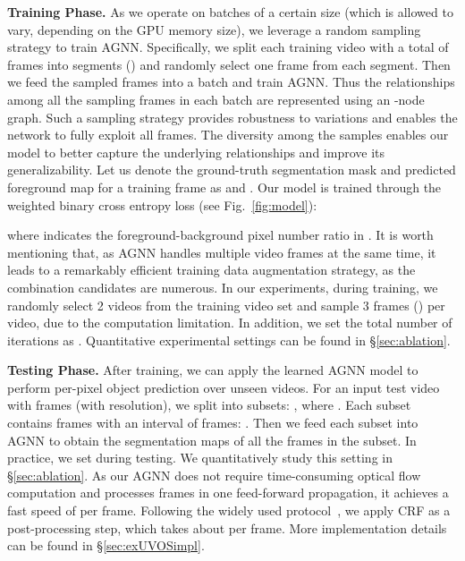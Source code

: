 \documentclass[10pt,twocolumn,letterpaper]{article}
\begin{document}
\noindent\textbf{Training Phase.} As we operate on batches of a certain size (which is allowed to vary, depending on the GPU memory size), we leverage a random sampling strategy to train AGNN. Specifically, we split each training video  with a total of  frames into  segments () and randomly select one frame from each segment. Then we feed the  sampled frames into a batch and train AGNN. Thus the relationships among all the  sampling frames in each batch are represented using an -node graph. Such a sampling strategy provides robustness to variations and enables the network to fully exploit all frames. The diversity among the samples enables our model to better capture the underlying relationships and improve its generalizability. Let us denote the ground-truth segmentation mask and predicted foreground map for a training frame  as  and . Our model is trained through the weighted binary cross entropy loss  (see Fig.~\ref{fig:model}):
	\vspace*{-3pt}

where  indicates the foreground-background pixel number ratio in .
It is worth mentioning that, as AGNN handles multiple video frames at the same time, it leads to a remarkably efficient training data augmentation strategy, as the combination candidates are numerous. In our experiments, during training, we randomly select 2 videos from the training video set and sample 3 frames () per video, due to the computation limitation. In addition, we set the total number of iterations as . Quantitative experimental settings can be found in \S\ref{sec:ablation}.

\noindent\textbf{Testing Phase.} After training, we can apply the learned AGNN model to perform per-pixel object prediction over unseen videos. For an input test video  with  frames (with  resolution), we split  into  subsets: , where . Each subset contains  frames with an interval of  frames: . Then we feed each subset into AGNN to obtain the segmentation maps of all the frames in the subset. In practice, we set  during testing. We quantitatively study this setting in \S\ref{sec:ablation}. As our AGNN does not require time-consuming optical flow computation and processes  frames in one feed-forward propagation, it achieves a fast speed of  per frame.  Following the widely used protocol~\cite{DBLP:conf/iccv/TokmakovAS17,DBLP:conf/cvpr/TokmakovAS17,Song_2018_ECCV}, we apply CRF as a post-processing step, which takes about  per frame. More implementation details can be found in \S\ref{sec:exUVOSimpl}.
\end{document}
